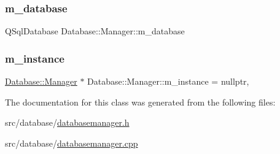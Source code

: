 \subsubsection{\texorpdfstring{m\+\_\+database}{m\_database}}
{\footnotesize\ttfamily Q\+Sql\+Database Database\+::\+Manager\+::m\+\_\+database\hspace{0.3cm}{\ttfamily [private]}}

\mbox{\label{classDatabase_1_1Manager_a35e8446687862c34ae818636f953f54e}} 
\subsubsection{\texorpdfstring{m\+\_\+instance}{m\_instance}}
{\footnotesize\ttfamily \mbox{\hyperlink{classDatabase_1_1Manager}{Database\+::\+Manager}} $\ast$ Database\+::\+Manager\+::m\+\_\+instance = nullptr\hspace{0.3cm}{\ttfamily [static]}, {\ttfamily [private]}}



The documentation for this class was generated from the following files\+:\begin{DoxyCompactItemize}
\item 
src/database/\mbox{\hyperlink{databasemanager_8h}{databasemanager.\+h}}\item 
src/database/\mbox{\hyperlink{databasemanager_8cpp}{databasemanager.\+cpp}}\end{DoxyCompactItemize}
